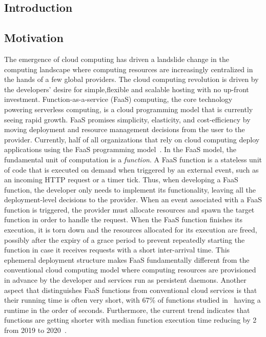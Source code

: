 \documentclass[../main.tex]{subfiles}
\begin{document}
\ifx\chapincluded\undefined
  \begin{refsection}
 \fi

\chapter{Introduction}
\label{chap:intro}

\section{Motivation}

The emergence of cloud computing has driven a landslide change in the
computing landscape where computing resources are increasingly
centralized in the hands of a few global providers. The cloud
computing revolution is driven by the developers' desire for
simple,flexible and scalable hosting with no up-front
investment. Function-as-a-service (FaaS) computing, the core
technology powering serverless computing, is a cloud programming model
that is currently seeing rapid growth. FaaS promises simplicity,
elasticity, and cost-efficiency by moving deployment and resource
management decisions from the user to the provider. Currently, half of
all organizations that rely on cloud computing deploy applications
using the FaaS programming model~\cite{serverless_state}. In the FaaS
model, the fundamental unit of computation is a \emph{function}. A
FaaS function is a stateless unit of code that is executed on demand
when triggered by an external event, such as an incoming HTTP request
or a timer tick. Thus, when developing a FaaS function, the developer
only needs to implement its functionality, leaving all the
deployment-level decisions to the provider.
When an event associated with a FaaS function is triggered, the
provider must allocate resources and spawn the target function in
order to handle the request. When the FaaS function finishes its
execution, it is torn down and the resources allocated for its
execution are freed, possibly after the expiry of a grace period to
prevent repeatedly starting the function in case it receives requests
with a short inter-arrival time. This ephemeral deployment structure
makes FaaS fundamentally different from the conventional cloud
computing model where computing resources are provisioned in advance
by the developer and services run as persistent daemons. Another
aspect that distinguishes FaaS functions from conventional cloud
services is that their running time is often very short, with 67\% of
functions studied
in~\cite{eismann20_review_server_use_cases_their_charac} having a
runtime in the order of seconds. Furthermore, the current trend
indicates that functions are getting shorter with median function
execution time reducing by 2\texttimes{} from 2019 to
2020~\cite{serverless_state_21}.



\end{refsection}
\end{document}
